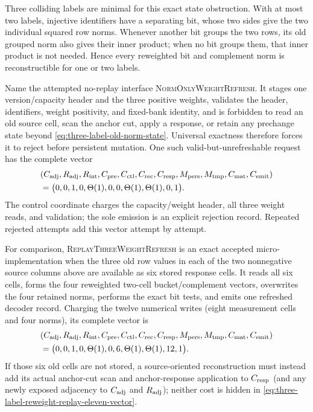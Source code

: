 \begin{proposition}
Three colliding labels are minimal for this exact state obstruction.  With at
most two labels, injective identifiers have a separating bit, whose two sides
give the two individual squared row norms.  Whenever another bit groups the
two rows, its old grouped norm also gives their inner product; when no bit
groups them, that inner product is not needed.  Hence every reweighted bit and
complement norm is reconstructible for one or two labels.

Name the attempted no-replay interface \textsc{NormOnlyWeightRefresh}.  It
stages one version/capacity header and the three positive weights, validates
the header, identifiers, weight positivity, and fixed-bank identity, and is
forbidden to read an old source cell, scan the anchor cut, apply a response,
or retain any prechange state beyond \cref{eq:three-label-old-norm-state}.
Universal exactness therefore forces it to reject before persistent mutation.
One such valid-but-unrefreshable request has the complete vector
\begin{equation}
 \begin{aligned}
 &(C_{\rm adj},R_{\rm adj},R_{\rm int},C_{\rm pre},C_{\rm ctl},C_{\rm rec},
 C_{\rm resp},M_{\rm pers},M_{\rm tmp},C_{\rm mat},C_{\rm emit})\\
 &=\bigl(0,0,1,0,\Theta(1),0,0,\Theta(1),\Theta(1),0,1\bigr).
 \end{aligned}
 \label{eq:three-label-reweight-rejection-eleven-vector}
\end{equation}
The control coordinate charges the capacity/weight header, all three weight
reads, and validation; the sole emission is an explicit rejection record.
Repeated rejected attempts add this vector attempt by attempt.

For comparison, \textsc{ReplayThreeWeightRefresh} is an exact accepted
micro-implementation when the three old row values in each of the two
nonnegative source columns above are available as six stored response cells.
It reads all six cells, forms the four reweighted two-cell bucket/complement
vectors, overwrites the four retained norms, performs the exact bit tests,
and emits one refreshed decoder record.  Charging the twelve numerical writes
(eight measurement cells and four norms), its complete vector is
\begin{equation}
 \begin{aligned}
 &(C_{\rm adj},R_{\rm adj},R_{\rm int},C_{\rm pre},C_{\rm ctl},C_{\rm rec},
 C_{\rm resp},M_{\rm pers},M_{\rm tmp},C_{\rm mat},C_{\rm emit})\\
 &=\bigl(0,0,1,0,\Theta(1),0,6,\Theta(1),\Theta(1),12,1\bigr).
 \end{aligned}
 \label{eq:three-label-reweight-replay-eleven-vector}
\end{equation}
If those six old cells are not stored, a source-oriented reconstruction must
instead add its actual anchor-cut scan and anchor-response application to
$C_{\rm resp}$ (and any newly exposed adjacency to $C_{\rm adj}$ and
$R_{\rm adj}$); neither cost is hidden in
\cref{eq:three-label-reweight-replay-eleven-vector}.


\end{proposition}
